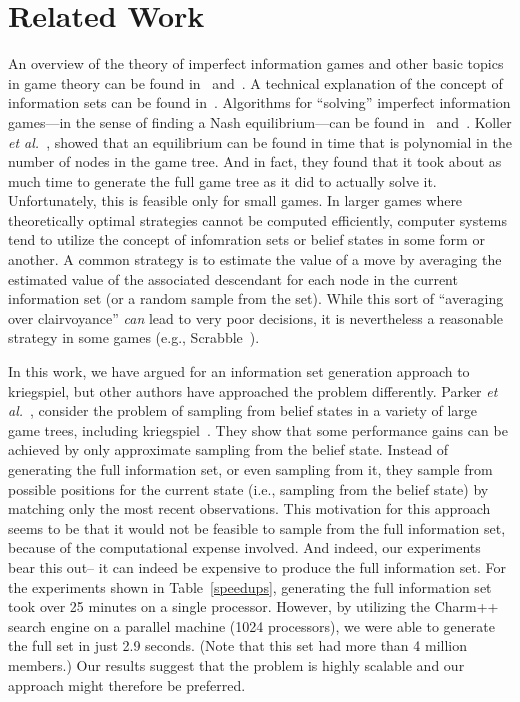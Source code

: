 \documentclass[11pt]{article}
\newcommand{\etal}{{\em et al.}\ }
\begin{document}
\section{Related Work}
An overview of the theory of imperfect information games and other basic topics in game theory can be found
in~\cite{kuhn03lectures} and~\cite{kuhn97classics}.  A technical explanation of the concept of information sets can be
found in~\cite{gilpin07algorithms}.  Algorithms for ``solving'' imperfect information games---in the sense of finding a
Nash equilibrium---can be found in~\cite{koller94fast} and~\cite{koller97representations}.  Koller \etal, showed that an
equilibrium can be found in time that is polynomial in the number of nodes in the game tree.  And in fact, they found
that it took about as much time to generate the full game tree as it did to actually solve it.  Unfortunately, this is
feasible only for small games.  In larger games where theoretically optimal strategies cannot be computed efficiently,
computer systems tend to utilize the concept of infomration sets or belief states in some form or another.  A common
strategy is to estimate the value of a move by averaging the estimated value of the associated descendant for each node
in the current information set (or a random sample from the set).  While this sort of ``averaging over clairvoyance''
{\em can} lead to very poor decisions, it is nevertheless a reasonable strategy in some games (e.g.,
Scrabble~\cite{sheppard02world}).

In this work, we have argued for an information set generation approach to kriegspiel, but other authors have approached
the problem differently.  Parker \etal, consider the problem of sampling from belief states in a variety of large game
trees, including kriegspiel~\cite{parker05game}.  They show that some performance gains can be achieved by only
approximate sampling from the belief state.  Instead of generating the full information set, or even sampling from it,
they sample from possible positions for the current state (i.e., sampling from the belief state) by matching only the
most recent observations.  This motivation for this approach seems to be that it would not be feasible to sample from
the full information set, because of the computational expense involved.  And indeed, our experiments bear this out-- it
can indeed be expensive to produce the full information set.  For the experiments shown in Table~\ref{speedups},
generating the full information set took over 25 minutes on a single processor.  However, by utilizing the Charm++
search engine on a parallel machine (1024 processors), we were able to generate the full set in just 2.9 seconds.  (Note
that this set had more than 4 million members.)  Our results suggest that the problem is highly scalable and our
approach might therefore be preferred.
\end{document}
